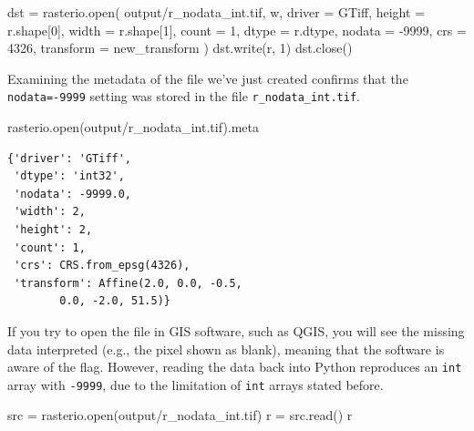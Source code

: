 \documentclass[
  letterpaper,
]{krantz}
\newenvironment{Shaded}{\begin{snugshade}}{\end{snugshade}}
\newcommand{\BuiltInTok}[1]{\textcolor[rgb]{0.00,0.23,0.31}{#1}}
\newcommand{\DecValTok}[1]{\textcolor[rgb]{0.68,0.00,0.00}{#1}}
\newcommand{\NormalTok}[1]{\textcolor[rgb]{0.00,0.23,0.31}{#1}}
\newcommand{\OperatorTok}[1]{\textcolor[rgb]{0.37,0.37,0.37}{#1}}
\newcommand{\StringTok}[1]{\textcolor[rgb]{0.13,0.47,0.30}{#1}}
\begin{document}
\begin{Shaded}
\begin{Highlighting}[]
\NormalTok{dst }\OperatorTok{=}\NormalTok{ rasterio.}\BuiltInTok{open}\NormalTok{(}
    \StringTok{\textquotesingle{}output/r\_nodata\_int.tif\textquotesingle{}}\NormalTok{, }\StringTok{\textquotesingle{}w\textquotesingle{}}\NormalTok{, }
\NormalTok{    driver }\OperatorTok{=} \StringTok{\textquotesingle{}GTiff\textquotesingle{}}\NormalTok{,}
\NormalTok{    height }\OperatorTok{=}\NormalTok{ r.shape[}\DecValTok{0}\NormalTok{],}
\NormalTok{    width }\OperatorTok{=}\NormalTok{ r.shape[}\DecValTok{1}\NormalTok{],}
\NormalTok{    count }\OperatorTok{=} \DecValTok{1}\NormalTok{,}
\NormalTok{    dtype }\OperatorTok{=}\NormalTok{ r.dtype,}
\NormalTok{    nodata }\OperatorTok{=} \OperatorTok{{-}}\DecValTok{9999}\NormalTok{,}
\NormalTok{    crs }\OperatorTok{=} \DecValTok{4326}\NormalTok{,}
\NormalTok{    transform }\OperatorTok{=}\NormalTok{ new\_transform}
\NormalTok{)}
\NormalTok{dst.write(r, }\DecValTok{1}\NormalTok{)}
\NormalTok{dst.close()}
\end{Highlighting}
\end{Shaded}

Examining the metadata of the file we've just created confirms that the
\texttt{nodata=-9999} setting was stored in the file
\texttt{r\_nodata\_int.tif}.

\begin{Shaded}
\begin{Highlighting}[]
\NormalTok{rasterio.}\BuiltInTok{open}\NormalTok{(}\StringTok{\textquotesingle{}output/r\_nodata\_int.tif\textquotesingle{}}\NormalTok{).meta}
\end{Highlighting}
\end{Shaded}

\begin{verbatim}
{'driver': 'GTiff',
 'dtype': 'int32',
 'nodata': -9999.0,
 'width': 2,
 'height': 2,
 'count': 1,
 'crs': CRS.from_epsg(4326),
 'transform': Affine(2.0, 0.0, -0.5,
        0.0, -2.0, 51.5)}
\end{verbatim}

If you try to open the file in GIS software, such as QGIS, you will see
the missing data interpreted (e.g., the pixel shown as blank), meaning
that the software is aware of the flag. However, reading the data back
into Python reproduces an \texttt{int} array with \texttt{-9999}, due to
the limitation of \texttt{int} arrays stated before.

\begin{Shaded}
\begin{Highlighting}[]
\NormalTok{src }\OperatorTok{=}\NormalTok{ rasterio.}\BuiltInTok{open}\NormalTok{(}\StringTok{\textquotesingle{}output/r\_nodata\_int.tif\textquotesingle{}}\NormalTok{)}
\NormalTok{r }\OperatorTok{=}\NormalTok{ src.read()}
\NormalTok{r}
\end{Highlighting}
\end{Shaded}
\end{document}
